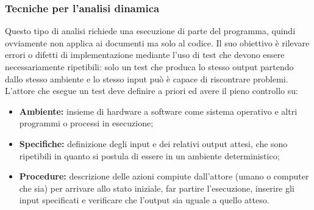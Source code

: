 \documentclass[a4paper]{article}
\begin{document}
			\subsubsection{Tecniche per l'analisi dinamica}
				Questo tipo di analisi richiede una esecuzione di parte del programma, quindi ovviamente non applica 
				ai documenti ma solo al codice. Il suo obiettivo è rilevare errori o difetti di implementazione 
				mediante l'uso di test che devono essere necessariamente ripetibili: solo un test che produca lo 
				stesso output partendo dallo stesso ambiente e lo stesso input può è capace di riscontrare problemi. 
				L'attore che esegue un test deve definire a priori ed avere il pieno controllo su:
				\begin{itemize}
					\item \textbf{Ambiente:} insieme di hardware a software come sistema operativo e altri programmi o 
					processi in esecuzione;
					\item \textbf{Specifiche:} definizione degli input e dei relativi output attesi, che sono ripetibili 
					in quanto si postula di essere in un ambiente deterministico;
					\item \textbf{Procedure:} descrizione delle azioni compiute dall'attore (umano o computer che sia) 
					per arrivare allo stato iniziale, far partire l'esecuzione, inserire gli input specificati e verificare 
					che l'output sia uguale a quello atteso.
				\end{itemize}
				
\end{document}
